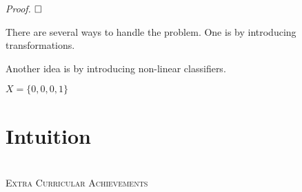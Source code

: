 \documentclass[12pt,openany]{book}
\theoremstyle{definition}
\theoremstyle{definition}
\begin{document}
\textit{Proof.} $\hfill \square$

There are several ways to handle the problem. One is by introducing transformations.

Another idea is by introducing non-linear classifiers.

$X=\{0,0,0,1\}$

\section{Intuition}


\section{}

\begin{snugshade*}
\noindent\textsc{Extra Curricular Achievements}
\end{snugshade*}
\end{document}
